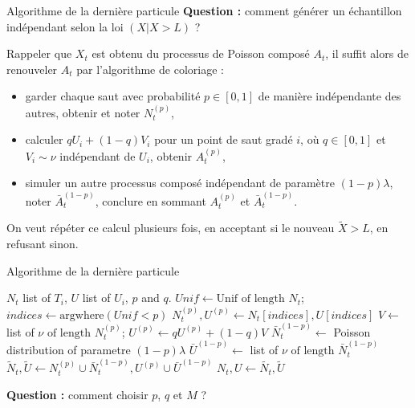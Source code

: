 \documentclass{beamer}
\begin{document}
\begin{frame}{Algorithme de la dernière particule}
\textbf{Question :} comment générer un échantillon indépendant selon la loi $(X|X>L)$ ?\pause

Rappeler que $X_t$ est obtenu du processus de Poisson composé $A_t$, il suffit alors de renouveler $A_t$ par l'algorithme de coloriage :\pause

\begin{itemize}
    \item garder chaque saut avec probabilité $p\in [0,1]$ de manière indépendante des autres, obtenir et noter $N_t^{(p)}$,
    \item calculer $qU_i+(1-q)V_i$ pour un point de saut gradé $i$, où $q\in[0,1]$ et $V_i\sim \nu$ indépendant de $U_i$, obtenir $A_t^{(p)}$,
    \item simuler un autre processus composé indépendant de paramètre $(1-p)\lambda$, noter $\bar{A}_t^{(1-p)}$, conclure en sommant $A_t^{(p)}$ et $\bar{A}_t^{(1-p)}$.
\end{itemize}

On veut répéter ce calcul plusieurs fois, en acceptant si le nouveau $\tilde{X}>L$, en refusant sinon.  
    
\end{frame}

\begin{frame}{Algorithme de la dernière particule}
        \begin{algorithm}[H]
\begin{algorithmic}[1]
\Require $N_t$ list of $T_i$, $U$ list of $U_i$, $p$ and $q$.
\State $Unif \gets \text{Unif of length } N_t$; $indices\gets \text{argwhere}(Unif < p)$
\State $N_t^{(p)}, U^{(p)}\gets N_t[indices], U[indices]$
\State $V \gets$ list of $\nu\text{ of length } N_t^{(p)}$; $U^{(p)}\gets qU^{(p)}+(1-q)V$
\State $\bar{N}_t^{(1-p)}\gets$ Poisson distribution of parametre $(1-p)\lambda$
\State $\bar{U}^{(1-p)}\gets$ list of $\nu\text{ of length } \bar{N}_t^{(1-p)}$
\State $\tilde{N}_t, \tilde{U}\gets N_t^{(p)}\cup \bar{N}_t^{(1-p)}, U^{(p)}\cup \bar{U}^{(1-p)}$
\State $N_t,U\gets \tilde{N_t},\tilde{U}$
\EndIf
\EndFor
\end{algorithmic}
\caption{Algorithme pour obtenir un nouveau $\tilde{A}_t$}
\end{algorithm}
\textbf{Question :} comment choisir $p$, $q$ et $M$ ?
\end{frame}
\end{document}
